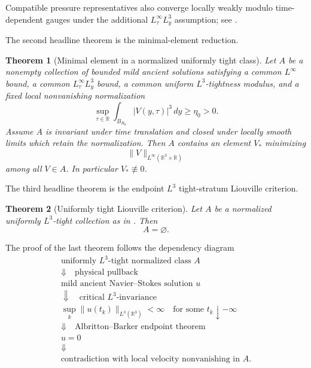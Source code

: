 \documentclass[11pt]{amsart}
\theoremstyle{plain}
\newtheorem{theorem}{Theorem}[section]
\theoremstyle{definition}
\theoremstyle{remark}
\numberwithin{equation}{section}
\newcommand{\R}{\mathbb R}
\begin{document}
Compatible pressure representatives also converge locally weakly modulo
time-dependent gauges under the additional \(L^\infty_\tau L^3_y\) assumption;
see .

The second headline theorem is the minimal-element reduction.

\begin{theorem}[Minimal element in a normalized uniformly tight class]
\label{thm:minimal-tight-intro}
Let \(A\) be a nonempty collection of bounded mild ancient solutions satisfying
a common \(L^\infty\) bound, a common \(L^\infty_\tau L^3_y\) bound, a common
uniform \(L^3\)-tightness modulus, and a fixed local nonvanishing
normalization
\[
   \sup_{\tau\in\R}\int_{B_{R_0}}|V(y,\tau)|^3\,dy\ge \eta_0>0.
\]
Assume \(A\) is invariant under time translation and closed under locally
smooth limits which retain the normalization.  Then \(A\) contains an element
\(V_*\) minimizing
\[
   \|V\|_{L^\infty(\R^3\times\R)}
\]
among all \(V\in A\).  In particular \(V_*\not\equiv0\).
\end{theorem}

The third headline theorem is the endpoint \(L^3\) tight-stratum Liouville
criterion.

\begin{theorem}[Uniformly tight Liouville criterion]
\label{thm:tight-liouville-intro}
Let \(A\) be a normalized uniformly \(L^3\)-tight collection as in
.  Then
\[
   A=\varnothing .
\]
\end{theorem}

The proof of the last theorem follows the dependency diagram
\[
\begin{array}{c}
\text{uniformly \(L^3\)-tight normalized class }A\\[2mm]
\Downarrow\quad\text{physical pullback}\\[2mm]
\text{mild ancient Navier--Stokes solution }u\\[2mm]
\Downarrow\quad\text{critical \(L^3\)-invariance}\\[2mm]
\sup_k\|u(t_k)\|_{L^3(\R^3)}<\infty
\quad\text{for some }t_k\downarrow-\infty\\[2mm]
\Downarrow\quad\text{Albritton--Barker endpoint theorem}\\[2mm]
u=0\\[2mm]
\Downarrow\\[2mm]
\text{contradiction with local velocity nonvanishing in }A .
\end{array}
\]
\end{document}
